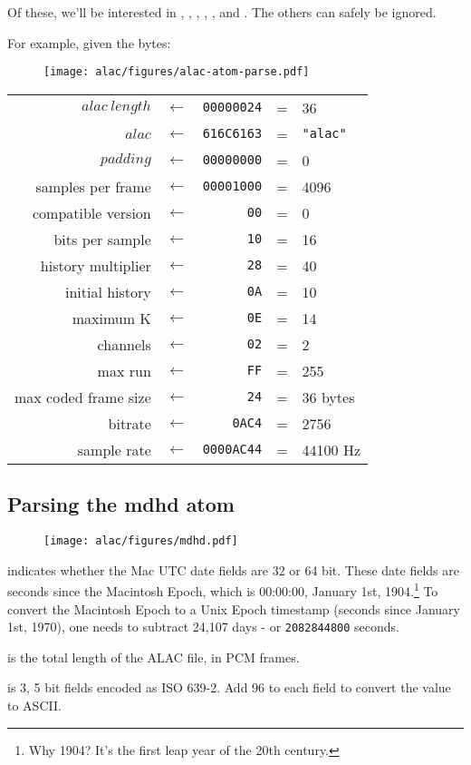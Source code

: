 Of these, we'll be interested in ,
, , ,
,  and .
The others can safely be ignored.

\clearpage

For example, given the bytes:
\par
\begin{figure}[h]
\texttt{[image: alac/figures/alac-atom-parse.pdf]}
\end{figure}
\begin{tabular}{rcrcl}
$alac~length$ & $\leftarrow$ & \texttt{00000024} & = & 36 \\
$alac$ & $\leftarrow$ & \texttt{616C6163} & = & \texttt{"alac"} \\
$padding$ & $\leftarrow$ & \texttt{00000000} & = & 0 \\
samples per frame & $\leftarrow$ & \texttt{00001000} & = & 4096 \\
compatible version & $\leftarrow$ & \texttt{00} & = & 0 \\
bits per sample & $\leftarrow$ & \texttt{10} & = & 16 \\
history multiplier & $\leftarrow$ & \texttt{28} & = & 40 \\
initial history & $\leftarrow$ & \texttt{0A} & = & 10 \\
maximum K & $\leftarrow$ & \texttt{0E} & = & 14 \\
channels & $\leftarrow$ & \texttt{02} & = & 2 \\
max run & $\leftarrow$ & \texttt{FF} & = & 255 \\
max coded frame size & $\leftarrow$ & \texttt{24} & = & 36 bytes \\
bitrate & $\leftarrow$ & \texttt{0AC4} & = & 2756 \\
sample rate & $\leftarrow$ & \texttt{0000AC44} & = & 44100 Hz\\
\end{tabular}

\clearpage

\subsection{Parsing the mdhd atom}
\label{alac:read_mdhd_atom}
\begin{figure}[h]
\texttt{[image: alac/figures/mdhd.pdf]}
\end{figure}
\par
\noindent
{} indicates whether the Mac UTC date fields are 32 or 64 bit.
These date fields are seconds since the Macintosh Epoch,
which is 00:00:00, January 1st, 1904.\footnote{Why 1904?
 It's the first leap year of the 20th century.}
To convert the Macintosh Epoch to a Unix Epoch timestamp
(seconds since January 1st, 1970), one needs to subtract 24,107 days -
or \texttt{2082844800} seconds.
\par
\noindent
{} is the total length of the ALAC file, in PCM frames.
\par
\noindent
{} is 3, 5 bit fields encoded as ISO 639-2.
Add 96 to each field to convert the value to ASCII.

